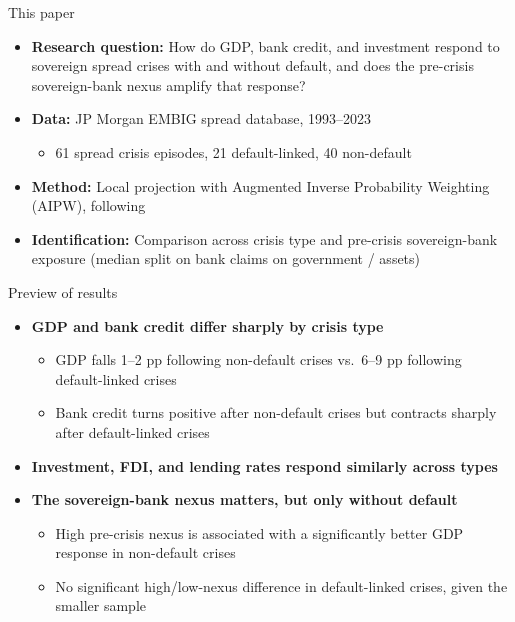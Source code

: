 \documentclass[aspectratio=169]{beamer}
\begin{document}
\begin{frame}{This paper}
  \begin{itemize}
    \item \textbf{Research question:} How do GDP, bank credit, and investment
    respond to sovereign spread crises with and without default, and does the
    pre-crisis sovereign-bank nexus amplify that response?
    \item \textbf{Data:} JP Morgan EMBIG spread database, 1993--2023
    \begin{itemize}
      \item 61 spread crisis episodes, 21 default-linked, 40 non-default
    \end{itemize}
    \item \textbf{Method:} Local projection with Augmented Inverse Probability
    Weighting (AIPW), following \citet{jorda2016time}
    \item \textbf{Identification:} Comparison across crisis type and
    pre-crisis sovereign-bank exposure (median split on bank claims on
    government / assets)
  \end{itemize}
\end{frame}

\begin{frame}{Preview of results}
  \begin{itemize}
    \item \textbf{GDP and bank credit differ sharply by crisis type}
    \begin{itemize}
      \item GDP falls 1--2 pp following non-default crises vs.\ 6--9 pp
      following default-linked crises
      \item Bank credit turns positive after non-default crises but
      contracts sharply after default-linked crises
    \end{itemize}
    \item \textbf{Investment, FDI, and lending rates respond similarly
    across types}
    \item \textbf{The sovereign-bank nexus matters, but only without default}
    \begin{itemize}
      \item High pre-crisis nexus is associated with a significantly better
      GDP response in non-default crises
      \item No significant high/low-nexus difference in default-linked
      crises, given the smaller sample
    \end{itemize}
  \end{itemize}
\end{frame}
\end{document}
